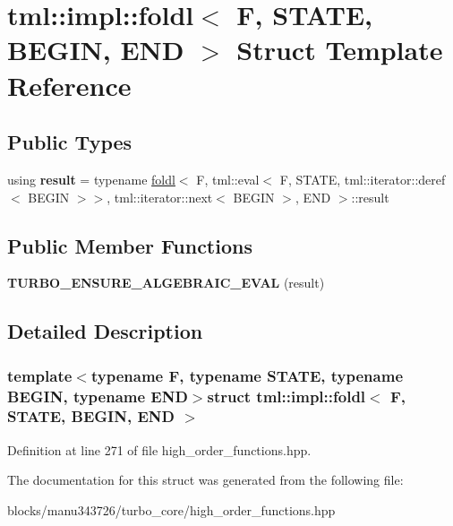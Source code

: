 \hypertarget{structtml_1_1impl_1_1foldl_3_01_f_00_01_s_t_a_t_e_00_01_b_e_g_i_n_00_01_e_n_d_01_4}{\section{tml\+:\+:impl\+:\+:foldl$<$ F, S\+T\+A\+T\+E, B\+E\+G\+I\+N, E\+N\+D $>$ Struct Template Reference}
\label{structtml_1_1impl_1_1foldl_3_01_f_00_01_s_t_a_t_e_00_01_b_e_g_i_n_00_01_e_n_d_01_4}
}
\subsection*{Public Types}
\begin{DoxyCompactItemize}
\item 
\hypertarget{structtml_1_1impl_1_1foldl_3_01_f_00_01_s_t_a_t_e_00_01_b_e_g_i_n_00_01_e_n_d_01_4_a06ff0d75189aea2154c99458bfff3208}{using {\bfseries result} = typename \hyperlink{structtml_1_1impl_1_1foldl}{foldl}$<$ F, tml\+::eval$<$ F, S\+T\+A\+T\+E, tml\+::iterator\+::deref$<$ B\+E\+G\+I\+N $>$$>$, tml\+::iterator\+::next$<$ B\+E\+G\+I\+N $>$, E\+N\+D $>$\+::result}\label{structtml_1_1impl_1_1foldl_3_01_f_00_01_s_t_a_t_e_00_01_b_e_g_i_n_00_01_e_n_d_01_4_a06ff0d75189aea2154c99458bfff3208}

\end{DoxyCompactItemize}
\subsection*{Public Member Functions}
\begin{DoxyCompactItemize}
\item 
\hypertarget{structtml_1_1impl_1_1foldl_3_01_f_00_01_s_t_a_t_e_00_01_b_e_g_i_n_00_01_e_n_d_01_4_ae10f12aea576ff427f05a73a103df9a2}{{\bfseries T\+U\+R\+B\+O\+\_\+\+E\+N\+S\+U\+R\+E\+\_\+\+A\+L\+G\+E\+B\+R\+A\+I\+C\+\_\+\+E\+V\+A\+L} (result)}\label{structtml_1_1impl_1_1foldl_3_01_f_00_01_s_t_a_t_e_00_01_b_e_g_i_n_00_01_e_n_d_01_4_ae10f12aea576ff427f05a73a103df9a2}

\end{DoxyCompactItemize}


\subsection{Detailed Description}
\subsubsection*{template$<$typename F, typename S\+T\+A\+T\+E, typename B\+E\+G\+I\+N, typename E\+N\+D$>$struct tml\+::impl\+::foldl$<$ F, S\+T\+A\+T\+E, B\+E\+G\+I\+N, E\+N\+D $>$}



Definition at line 271 of file high\+\_\+order\+\_\+functions.\+hpp.



The documentation for this struct was generated from the following file\+:\begin{DoxyCompactItemize}
\item 
blocks/manu343726/turbo\+\_\+core/high\+\_\+order\+\_\+functions.\+hpp\end{DoxyCompactItemize}
